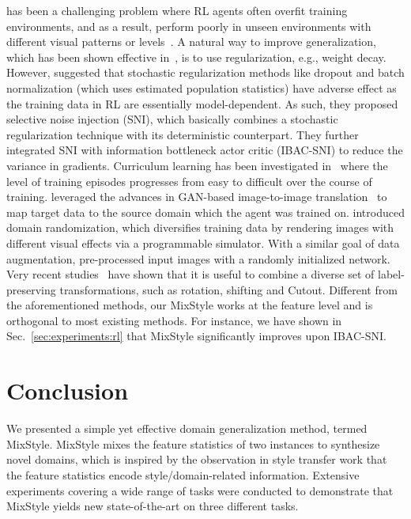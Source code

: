 \documentclass{article} \usepackage{iclr2021_conference,times}
\makeatletter
\renewcommand\paragraph{\@startsection{paragraph}{4}{\z@}{.1em \@plus1ex \@minus.2ex}{-.5em}{\normalfont\normalsize\bfseries}}
\makeatother
\begin{document}
\paragraph{Generalization in deep RL}
has been a challenging problem where RL agents often overfit training environments, and as a result, perform poorly in unseen environments with different visual patterns or levels~\citep{zhang2018study}. A natural way to improve generalization, which has been shown effective in~\citep{cobbe2019quantifying,farebrother2018generalization}, is to use regularization, e.g., weight decay. However, \citet{igl2019generalization} suggested that stochastic regularization methods like dropout and batch normalization (which uses estimated population statistics) have adverse effect as the training data in RL are essentially model-dependent. As such, they proposed selective noise injection (SNI), which basically combines a stochastic regularization technique with its deterministic counterpart. They further integrated SNI with information bottleneck actor critic (IBAC-SNI) to reduce the variance in gradients. Curriculum learning has been investigated in~\citep{justesen2018illuminating} where the level of training episodes progresses from easy to difficult over the course of training. \citet{gamrian2019transfer} leveraged the advances in GAN-based image-to-image translation~\citep{liu2017unsupervised} to map target data to the source domain which the agent was trained on. \citet{tobin2017domain} introduced domain randomization, which diversifies training data by rendering images with different visual effects via a programmable simulator. With a similar goal of data augmentation, \citet{lee2020network} pre-processed input images with a randomly initialized network. Very recent studies~\citep{laskin2020reinforcement,kostrikov2020image} have shown that it is useful to combine a diverse set of label-preserving transformations, such as rotation, shifting and Cutout. Different from the aforementioned methods, our MixStyle works at the feature level and is orthogonal to most existing methods. For instance, we have shown in Sec.~\ref{sec:experiments:rl} that MixStyle significantly improves upon IBAC-SNI.


\section{Conclusion}
We presented a simple yet effective domain generalization method, termed MixStyle. MixStyle mixes the feature statistics of two instances to synthesize novel domains, which is inspired by the observation in style transfer work that the feature statistics encode style/domain-related information. Extensive experiments covering a wide range of tasks were conducted to demonstrate that MixStyle yields new state-of-the-art on three different tasks.
\end{document}
